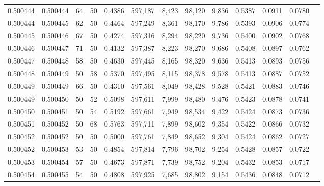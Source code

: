 \begin{tabular}{rrrrrrrrrrrrr}
0.500444 & 0.500444 &    64 &  50 &                                     0.4386 & 597,187 &   8,423 &  98,120 &   9,836 & 0.5387 & 0.0911 & 0.0780 \\
0.500444 & 0.500445 &    62 &  50 &                                     0.4464 & 597,249 &   8,361 &  98,170 &   9,786 & 0.5393 & 0.0906 & 0.0774 \\
0.500445 & 0.500446 &    67 &  50 &                                     0.4274 & 597,316 &   8,294 &  98,220 &   9,736 & 0.5400 & 0.0902 & 0.0768 \\
0.500446 & 0.500447 &    71 &  50 &                                     0.4132 & 597,387 &   8,223 &  98,270 &   9,686 & 0.5408 & 0.0897 & 0.0762 \\
0.500447 & 0.500448 &    58 &  50 &                                     0.4630 & 597,445 &   8,165 &  98,320 &   9,636 & 0.5413 & 0.0893 & 0.0756 \\
0.500448 & 0.500449 &    50 &  58 &                                     0.5370 & 597,495 &   8,115 &  98,378 &   9,578 & 0.5413 & 0.0887 & 0.0752 \\
0.500449 & 0.500449 &    66 &  50 &                                     0.4310 & 597,561 &   8,049 &  98,428 &   9,528 & 0.5421 & 0.0883 & 0.0746 \\
0.500449 & 0.500450 &    50 &  52 &                                     0.5098 & 597,611 &   7,999 &  98,480 &   9,476 & 0.5423 & 0.0878 & 0.0741 \\
0.500450 & 0.500451 &    50 &  54 &                                     0.5192 & 597,661 &   7,949 &  98,534 &   9,422 & 0.5424 & 0.0873 & 0.0736 \\
0.500451 & 0.500452 &    50 &  68 &                                     0.5763 & 597,711 &   7,899 &  98,602 &   9,354 & 0.5422 & 0.0866 & 0.0732 \\
0.500452 & 0.500452 &    50 &  50 &                                     0.5000 & 597,761 &   7,849 &  98,652 &   9,304 & 0.5424 & 0.0862 & 0.0727 \\
0.500452 & 0.500453 &    53 &  50 &                                     0.4854 & 597,814 &   7,796 &  98,702 &   9,254 & 0.5428 & 0.0857 & 0.0722 \\
0.500453 & 0.500454 &    57 &  50 &                                     0.4673 & 597,871 &   7,739 &  98,752 &   9,204 & 0.5432 & 0.0853 & 0.0717 \\
0.500454 & 0.500455 &    54 &  50 &                                     0.4808 & 597,925 &   7,685 &  98,802 &   9,154 & 0.5436 & 0.0848 & 0.0712 \\

\end{tabular}
